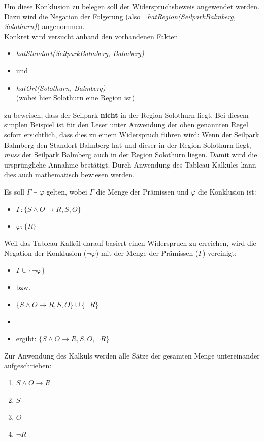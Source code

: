 \newpage
Um diese Konklusion zu belegen soll der Widerspruchsbeweis angewendet werden. Dazu wird die Negation der Folgerung (also $\neg$\textit{hatRegion(SeilparkBalmberg, Solothurn)}) angenommen.\\
Konkret wird versucht anhand den vorhandenen Fakten
\begin{itemize}
    \item \textit{hatStandort(SeilparkBalmberg, Balmberg)}
    \item[] und
    \item \textit{hatOrt(Solothurn, Balmberg)}\\
        (wobei hier Solothurn eine Region ist)
\end{itemize}
zu beweisen, dass der Seilpark \textbf{nicht} in der Region Solothurn liegt. Bei diesem simplen Beispiel ist für den Leser unter Anwendung der oben genannten Regel sofort ersichtlich, dass dies zu einem Widerspruch führen wird: Wenn der Seilpark Balmberg den Standort Balmberg hat und dieser in der Region Solothurn liegt, \textit{muss} der Seilpark Balmberg auch in der Region Solothurn liegen. Damit wird die ursprüngliche Annahme bestätigt. Durch Anwendung des Tableau-Kalküles kann dies auch mathematisch bewiesen werden.

Es soll $\Gamma \models \varphi$ gelten, wobei $\Gamma$ die Menge der Prämissen und $\varphi$ die Konklusion ist:
\begin{itemize}
    \item $\Gamma: \{S \wedge O \rightarrow R, S, O\}$
    \item $\varphi: \{R\}$
\end{itemize}

Weil das Tableau-Kalkül darauf basiert einen Widerspruch zu erreichen, wird die Negation der Konklusion ($\neg \varphi$) mit der Menge der Prämissen ($\Gamma$) vereinigt:
\begin{itemize}
    \item $\Gamma \cup \{\neg\varphi\}$
    \item[] bzw.
    \item $\{S \wedge O \rightarrow R, S, O\} \cup \{\neg R\}$
    \item[]
    \item[] ergibt: $\{S \wedge O \rightarrow R, S, O, \neg R\}$
\end{itemize}

Zur Anwendung des Kalküls werden alle Sätze der gesamten Menge untereinander aufgeschrieben:
\begin{enumerate}[label= (\alph*)]
    \item $ S \wedge O \rightarrow R $
    \item $S$
    \item $O$
    \item $\neg R$
\end{enumerate}

